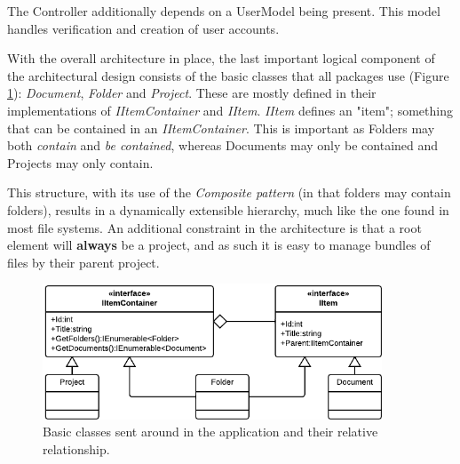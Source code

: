 The Controller additionally depends on a UserModel being present. This model handles verification
and creation of user accounts.

With the overall architecture in place, the last important logical component of the architectural design
consists of the basic classes that all packages use (Figure \ref{fig:basic-classes}): \emph{Document},
\emph{Folder} and \emph{Project}. These are mostly defined in their implementations of \emph{IItemContainer}
and \emph{IItem}. \emph{IItem} defines an "item"; something that can be contained in an
\emph{IItemContainer}. This is important as Folders may both \emph{contain} and \emph{be contained},
whereas Documents may only be contained and Projects may only contain.

This structure, with its use of the \emph{Composite pattern} (in that folders may contain folders), results in a
dynamically extensible hierarchy, much like the one found in most file systems. An additional constraint
in the architecture is that a root element will {\bf always} be a project, and as such it is easy to
manage bundles of files by their parent project.

\begin{figure}[htb]
	\centering
	\includegraphics[width=0.9\textwidth]{Software_architecture/graphics/basic-classes.png}
	\caption{Basic classes sent around in the application and their relative relationship.}
	\label{fig:basic-classes}
\end{figure}